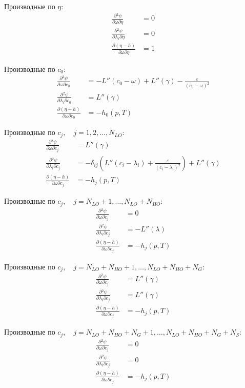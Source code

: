 \documentclass[12pt]{article}
\newcommand{\pd}[2]{\frac{\partial #1}{\partial #2}}
\begin{document}
Производные по $\eta$:
\begin{align*}
\pd{{}^2\psi}{\omega \partial \eta} &= 0\\
\pd{{}^2\psi}{\lambda_i \partial \eta} &= 0\\
\pd{(\eta - h)}{\omega \partial \eta} &= 1
\end{align*}

Производные по $c_0$:
\begin{align*}
\pd{{}^2\psi}{\omega \partial c_0} &= -L''(c_0 - \omega) + L''(\gamma) 
- \frac{\varepsilon}{(c_0 - \omega)^2}\\
\pd{{}^2\psi}{\lambda_i \partial c_0} &= L''(\gamma)\\
\pd{(\eta - h)}{\omega \partial c_0} &= -h_{0}(p,T)
\end{align*}

Производные по $c_j, \quad j = 1,2,\dots,N_{LO}$:
\begin{align*}
\pd{{}^2\psi}{\omega \partial c_j} &= L''(\gamma)\\
\pd{{}^2\psi}{\lambda_i \partial c_j} &= 
-\delta_{ij}\left(L''(c_i - \lambda_i) +
\frac{\varepsilon}{(c_i - \lambda_i)^2}\right)
+ L''(\gamma)\\
\pd{(\eta - h)}{\omega \partial c_j} &= -h_{j}(p,T)
\end{align*}

Производные по $c_j, \quad j = N_{LO}+1,\dots,N_{LO}+N_{HO}$:
\begin{align*}
\pd{{}^2\psi}{\omega \partial c_j} &= 0\\
\pd{{}^2\psi}{\lambda_i \partial c_j} &= -L''(\lambda)\\
\pd{(\eta - h)}{\omega \partial c_j} &= -h_{j}(p,T)
\end{align*}

Производные по $c_j, \quad j = N_{LO}+N_{HO}+1,\dots,N_{LO}+N_{HO}+N_{G}$:
\begin{align*}
\pd{{}^2\psi}{\omega \partial c_j} &= L''(\gamma)\\
\pd{{}^2\psi}{\lambda_i \partial c_j} &= L''(\gamma)\\
\pd{(\eta - h)}{\omega \partial c_j} &= -h_{j}(p,T)
\end{align*}

Производные по $c_j, \quad j =
N_{LO}+N_{HO}+N_{G}+1,\dots,N_{LO}+N_{HO}+N_{G}+N_{S}$:
\begin{align*}
\pd{{}^2\psi}{\omega \partial c_j} &= 0\\
\pd{{}^2\psi}{\lambda_i \partial c_j} &= 0\\
\pd{(\eta - h)}{\omega \partial c_j} &= -h_{j}(p,T)
\end{align*}
\end{document}
